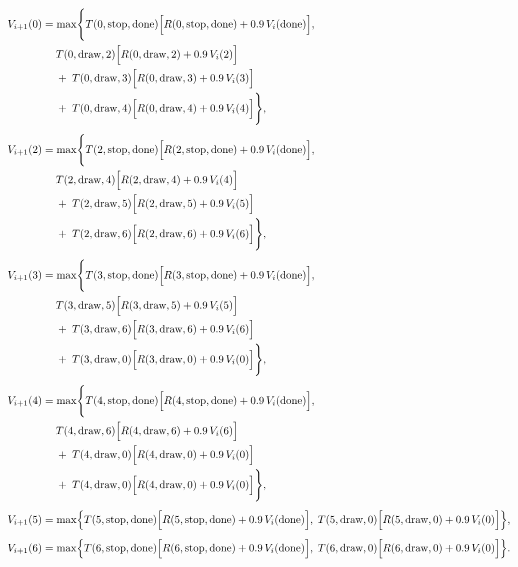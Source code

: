 \documentclass[11pt]{article}
\begin{document}
\begin{align*}
  V_{i+1}(0) &= \max\Biggl\{
    T(0,\text{stop},\text{done})\Bigl[R(0,\text{stop},\text{done}) + 0.9\,V_i(\text{done})\Bigr], \\
    &\quad\; T(0,\text{draw},2)\Bigl[R(0,\text{draw},2) + 0.9\,V_i(2)\Bigr] \\
    &\quad\; +\; T(0,\text{draw},3)\Bigl[R(0,\text{draw},3) + 0.9\,V_i(3)\Bigr] \\
    &\quad\; +\; T(0,\text{draw},4)\Bigl[R(0,\text{draw},4) + 0.9\,V_i(4)\Bigr]
  \Biggr\}, \\[1ex]
  V_{i+1}(2) &= \max\Biggl\{
    T(2,\text{stop},\text{done})\Bigl[R(2,\text{stop},\text{done}) + 0.9\,V_i(\text{done})\Bigr], \\
    &\quad\; T(2,\text{draw},4)\Bigl[R(2,\text{draw},4) + 0.9\,V_i(4)\Bigr] \\
    &\quad\; +\; T(2,\text{draw},5)\Bigl[R(2,\text{draw},5) + 0.9\,V_i(5)\Bigr] \\
    &\quad\; +\; T(2,\text{draw},6)\Bigl[R(2,\text{draw},6) + 0.9\,V_i(6)\Bigr]
  \Biggr\}, \\[1ex]
  V_{i+1}(3) &= \max\Biggl\{
    T(3,\text{stop},\text{done})\Bigl[R(3,\text{stop},\text{done}) + 0.9\,V_i(\text{done})\Bigr], \\
    &\quad\; T(3,\text{draw},5)\Bigl[R(3,\text{draw},5) + 0.9\,V_i(5)\Bigr] \\
    &\quad\; +\; T(3,\text{draw},6)\Bigl[R(3,\text{draw},6) + 0.9\,V_i(6)\Bigr] \\
    &\quad\; +\; T(3,\text{draw},0)\Bigl[R(3,\text{draw},0) + 0.9\,V_i(0)\Bigr]
  \Biggr\}, \\[1ex]
  V_{i+1}(4) &= \max\Biggl\{
    T(4,\text{stop},\text{done})\Bigl[R(4,\text{stop},\text{done}) + 0.9\,V_i(\text{done})\Bigr], \\
    &\quad\; T(4,\text{draw},6)\Bigl[R(4,\text{draw},6) + 0.9\,V_i(6)\Bigr] \\
    &\quad\; +\; T(4,\text{draw},0)\Bigl[R(4,\text{draw},0) + 0.9\,V_i(0)\Bigr] \\
    &\quad\; +\; T(4,\text{draw},0)\Bigl[R(4,\text{draw},0) + 0.9\,V_i(0)\Bigr]
  \Biggr\}, \\[1ex]
  V_{i+1}(5) &= \max\Bigl\{
    T(5,\text{stop},\text{done})\Bigl[R(5,\text{stop},\text{done}) + 0.9\,V_i(\text{done})\Bigr],\;
    T(5,\text{draw},0)\Bigl[R(5,\text{draw},0) + 0.9\,V_i(0)\Bigr]
  \Bigr\}, \\[1ex]
  V_{i+1}(6) &= \max\Bigl\{
    T(6,\text{stop},\text{done})\Bigl[R(6,\text{stop},\text{done}) + 0.9\,V_i(\text{done})\Bigr],\;
    T(6,\text{draw},0)\Bigl[R(6,\text{draw},0) + 0.9\,V_i(0)\Bigr]
  \Bigr\}.
\end{align*}
\end{document}
